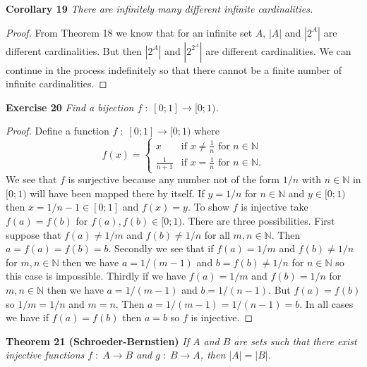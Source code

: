 \documentclass{article}
\begin{document}
\begin{flushleft}
\textbf{Corollary 19}
\textsl{There are infinitely many different infinite cardinalities.}
\begin{proof}
From Theorem 18 we know that for an infinite set $A$, $|A|$ and $|2^A|$ are different cardinalities. But then $|2^A|$ and $|2^{2^A}|$ are different cardinalities. We can continue in the process indefinitely so that there cannot be a finite number of infinite cardinalities.
\end{proof}

\textbf{Exercise 20}
\textsl{Find a bijection $f \; : \; [0;1] \rightarrow [0;1)$.}
\begin{proof}
Define a function $f \; : \; [0;1] \rightarrow [0;1)$ where
\[
f(x) =
\begin{cases}
x & \text{if $x \neq \frac{1}{n}$ for $n \in \mathbb{N}$} \\
\frac{1}{n+1} & \text{if $x=\frac{1}{n}$ for $n \in \mathbb{N}$}.
\end{cases}
\]
We see that $f$ is surjective because any number not of the form $1/n$ with $n \in \mathbb{N}$ in $[0;1)$ will have been mapped there by itself. If $y = 1/n$ for $n \in \mathbb{N}$ and $y \in [0;1)$ then $x = 1/n-1 \in [0;1]$ and $f(x) = y$. To show $f$ is injective take $f(a)=f(b)$ for $f(a), f(b) \in [0;1)$. There are three possibilities. First suppose that $f(a) \neq 1/m$ and $f(b) \neq 1/n$ for all $m,n \in \mathbb{N}$. Then $a=f(a)=f(b)=b$. Secondly we see that if $f(a) = 1/m$ and $f(b) \neq 1/n$ for $m,n \in \mathbb{N}$ then we have $a = 1/(m-1)$ and $b=f(b) \neq 1/n$ for $n \in \mathbb{N}$ so this case is impossible. Thirdly if we have $f(a)=1/m$ and $f(b)=1/n$ for $m,n \in \mathbb{N}$ then we have $a=1/(m-1)$ and $b=1/(n-1)$. But $f(a)=f(b)$ so $1/m=1/n$ and $m=n$. Then $a=1/(m-1)=1/(n-1)=b$. In all cases we have if $f(a)=f(b)$ then $a=b$ so $f$ is injective.
\end{proof}

\textbf{Theorem 21 (Schroeder-Bernstien)}
\textsl{If $A$ and $B$ are sets such that there exist injective functions $f \; : \; A \rightarrow B$ and $g \; : \; B \rightarrow A$, then $|A| = |B|$.}


\end{flushleft}
\end{document}
